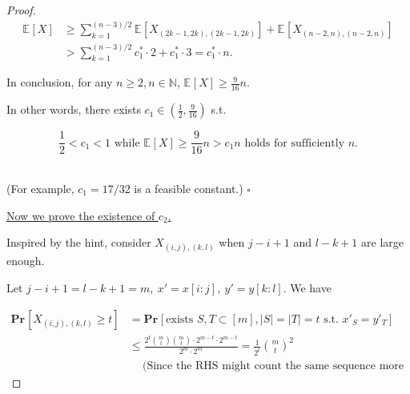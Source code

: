 \documentclass{article}
\renewcommand{\Pr}[2]{\mathbf{Pr}_{#1}\left[#2\right]}
\newcommand{\staExp}[2]{\mathbb{E}_{#1}\left[#2\right]}
\newcommand{\whiteqed}{\hfill $\square$\par}
\begin{document}
\begin{proof}
    \vspace{-2.5em}
    \begin{align*}
        \staExp{}{X} 
        &\geq \sum_{k=1}^{(n-3)/2}\staExp{}{X_{(2k-1,2k),(2k-1,2k)}}+\staExp{}{X_{(n-2,n),(n-2,n)}} \\
        & > \sum_{k=1}^{(n-3)/2} c_1^*\cdot 2 + c_1^*\cdot 3 = c_1^*\cdot n.
    \end{align*}
    
    \vspace{1.5em} \hspace{1.3em}
    In conclusion, for any $n\geq2, n\in\mathbb{N}$, $\staExp{}{X}\geq\frac{9}{16}n.$
    
    \vspace{0.5em} \hspace{1.3em}
    In other words, there exists $c_1\in(\frac{1}{2},\frac{9}{16})$ s.t. 
    
    \vspace{-1em}
    $$\frac{1}{2}<c_1<1\text{ while }\staExp{}{X}\geq\frac{9}{16}n>c_1n\text{ holds for sufficiently }n. $$ \
    
    \vspace{-1.5em} \hspace{1.3em}
    (For example, $c_1=17/32$ is a feasible constant.) \whiteqed
    
    \vspace{3em} \hspace{1.3em}
    \underline{Now we prove the existence of $c_2$.}
    
    \vspace{0.5em} \hspace{1.3em}
    Inspired by the hint, consider $X_{(i,j),(k,l)}$ when $j-i+1$ and $l-k+1$ are large enough. 
    
    \vspace{0.25em} \hspace{1.3em}
    Let $j-i+1=l-k+1=m,\ x'=x[i:j],\ y'=y[k:l]$. We have
    
    \vspace{-3em}
    \begin{align*}
        \Pr{}{X_{(i,j),(k,l)}\geq t} &=\Pr{}{\text{exists $S,T\subset[m], |S|=|T|=t$ s.t. $x'_S=y'_T$}} \\
        & \le\frac{2^t\binom{m}{t}\binom{m}{t}\cdot2^{m-t}\cdot2^{m-t}}{2^m\cdot 2^m} = \frac{1}{2^{t}}\binom{m}{t}^2 \\
        &\quad\ \text{(Since the RHS might count the same sequence more than once.)}
    \end{align*}
    

\end{proof}
\end{document}
